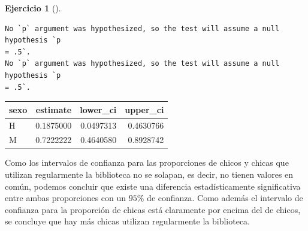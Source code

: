 \documentclass[
  a4paper,
]{scrreport}
\newenvironment{Shaded}{\begin{snugshade}}{\end{snugshade}}
\newcommand{\AttributeTok}[1]{\textcolor[rgb]{0.40,0.45,0.13}{#1}}
\newcommand{\FunctionTok}[1]{\textcolor[rgb]{0.28,0.35,0.67}{#1}}
\newcommand{\NormalTok}[1]{\textcolor[rgb]{0.00,0.23,0.31}{#1}}
\newcommand{\SpecialCharTok}[1]{\textcolor[rgb]{0.37,0.37,0.37}{#1}}
\newcommand{\StringTok}[1]{\textcolor[rgb]{0.13,0.47,0.30}{#1}}
\theoremstyle{definition}
\newtheorem{exercise}{Ejercicio}[chapter]
\theoremstyle{remark}
\begin{document}
\begin{exercise}[]
\begin{enumerate}
\begin{tcolorbox}
\begin{Shaded}
\end{Shaded}

\begin{verbatim}
No `p` argument was hypothesized, so the test will assume a null hypothesis `p
= .5`.
No `p` argument was hypothesized, so the test will assume a null hypothesis `p
= .5`.
\end{verbatim}

  \begin{longtable}[]{@{}lrrr@{}}
  \toprule\noalign{}
  sexo & estimate & lower\_ci & upper\_ci \\
  \midrule\noalign{}
  \endhead
  \bottomrule\noalign{}
  \endlastfoot
  H & 0.1875000 & 0.0497313 & 0.4630766 \\
  M & 0.7222222 & 0.4640580 & 0.8928742 \\
  \end{longtable}

  Como los intervalos de confianza para las proporciones de chicos y
  chicas que utilizan regularmente la biblioteca no se solapan, es
  decir, no tienen valores en común, podemos concluir que existe una
  diferencia estadísticamente significativa entre ambas proporciones con
  un \(95\%\) de confianza. Como además el intervalo de confianza para
  la proporción de chicas está claramente por encima del de chicos, se
  concluye que hay más chicas utilizan regularmente la biblioteca.

  \end{tcolorbox}
\end{enumerate}

\end{exercise}
\end{document}
